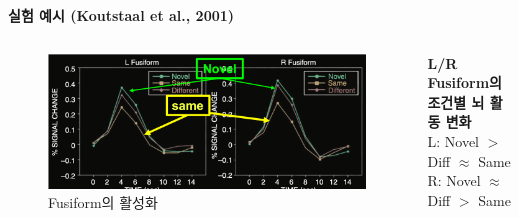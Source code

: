 \documentclass{beamer}
\begin{document}
\begin{frame}{\textbf{실험 예시 (Koutstaal et al., 2001)}}
\begin{columns}
\begin{column}{0.58\textwidth}
\begin{columns}
\begin{column}{0.6\textwidth}
\begin{figure}
            \centering
            \includegraphics[width=\textwidth]{image/Koutstaal_graph}
            \caption{Fusiform의 활성화}
          \end{figure}
          \vspace{-1em}
        \end{column}
        \hspace{-0.2em}
        \begin{column}{0.4\textwidth}
          \textbf{L/R Fusiform의 조건별 뇌 활동 변화}\\
          {\small
          L: Novel $>$ Diff $\approx$ Same\\
          R: Novel $\approx$ Diff $>$ Same
          }
        \end{column}
      \end{columns}
    \end{column}
  \end{columns}
  \hfill
\end{frame}
\end{document}
